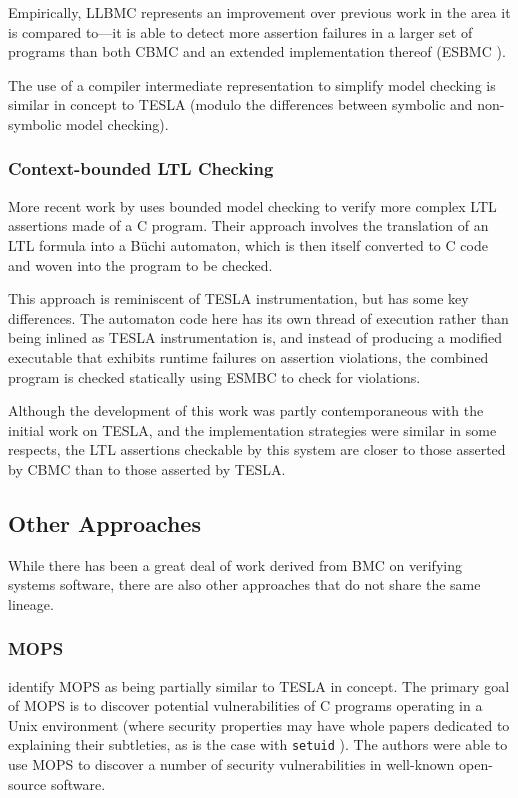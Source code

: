 Empirically, LLBMC represents an improvement over previous work in the
area it is compared to---it is able to detect more assertion failures in
a larger set of programs than both CBMC and an extended implementation
thereof (ESBMC \cite{cordeiro_smt-based_2009}).

The use of a compiler intermediate representation to simplify model
checking is similar in concept to TESLA (modulo the differences between
symbolic and non-symbolic model checking).

\subsubsection{Context-bounded LTL Checking}

More recent work by \textcite{morse_context-bounded_2011,
morse_model_2015-1} uses bounded model checking to verify more complex
LTL assertions made of a C program. Their approach involves the
translation of an LTL formula into a B\"uchi automaton, which is then
itself converted to C code and woven into the program to be checked.

This approach is reminiscent of TESLA instrumentation, but has some key
differences. The automaton code here has its own thread of execution
rather than being inlined as TESLA instrumentation is, and instead of
producing a modified executable that exhibits runtime failures on
assertion violations, the combined program is checked statically using
ESMBC to check for violations.

Although the development of this work was partly contemporaneous with
the initial work on TESLA, and the implementation strategies were
similar in some respects, the LTL assertions checkable by this system
are closer to those asserted by CBMC than to those asserted by TESLA.

\subsection{Other Approaches}

While there has been a great deal of work derived from BMC on verifying
systems software, there are also other approaches that do not share the
same lineage.

\subsubsection{MOPS}

\textcite{anderson_tesla:_2014} identify MOPS \cite{chen_mops:_2002} as being
partially similar to TESLA in concept. The primary goal of MOPS is to discover
potential vulnerabilities of C programs operating in a Unix environment (where
security properties may have whole papers dedicated to explaining their
subtleties, as is the case with \texttt{setuid} \cite{chen_setuid_2002}).
The authors were able to use MOPS to discover a number of security
vulnerabilities in well-known open-source software.

